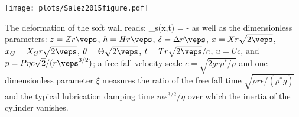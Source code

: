 \label{ssc:Thomas}


\begin{center}
\texttt{[image: plots/Salez2015figure.pdf]}
\end{center}

The deformation of the soft wall reads:
\beq \delta_s(x,t) = -   \eeq
as well as the dimensionless parameters:
$z=Zr\veps$, $h=Hr\veps$, $\delta = \Delta r\veps$, $x = Xr\sqrt{2\veps}$, $x_G=X_G r \sqrt{2\veps}$, $\theta = \Theta\sqrt{2\veps}$, $t=Tr\sqrt{2\veps}/c$, $u=Uc$, and $p=P\eta c\sqrt{2}/(r\veps^{3/2})$; a free fall velocity scale $c=\sqrt{2gr\rho^\ast / \rho}$ and one dimensionless parameter $\xi$ measures the ratio of the free fall time $\sqrt{\rho r \epsilon / (\rho^\ast g)}$ and the typical lubrication damping time $m\epsilon^{3/2}/\eta$ over which the inertia of the cylinder vanishes.
\beq \xi =  
\beq \kappa =  

